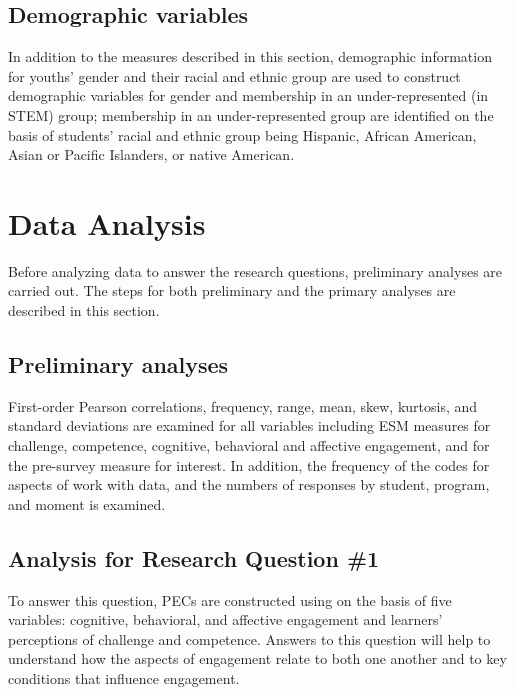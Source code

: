 \documentclass[]{msu-thesis}
\theoremstyle{definition}
\theoremstyle{definition}
\theoremstyle{definition}
\theoremstyle{remark}
\begin{document}
\subsection{Demographic variables}\label{demographic-variables}

In addition to the measures described in this section, demographic
information for youths' gender and their racial and ethnic group are
used to construct demographic variables for gender and membership in an
under-represented (in STEM) group; membership in an under-represented
group are identified on the basis of students' racial and ethnic group
being Hispanic, African American, Asian or Pacific Islanders, or native
American.

\section{Data Analysis}\label{data-analysis}

Before analyzing data to answer the research questions, preliminary
analyses are carried out. The steps for both preliminary and the primary
analyses are described in this section.

\subsection{Preliminary analyses}\label{preliminary-analyses}

First-order Pearson correlations, frequency, range, mean, skew,
kurtosis, and standard deviations are examined for all variables
including ESM measures for challenge, competence, cognitive, behavioral
and affective engagement, and for the pre-survey measure for interest.
In addition, the frequency of the codes for aspects of work with data,
and the numbers of responses by student, program, and moment is
examined.

\subsection{Analysis for Research Question
\#1}\label{analysis-for-research-question-1}

To answer this question, PECs are constructed using on the basis of five
variables: cognitive, behavioral, and affective engagement and learners'
perceptions of challenge and competence. Answers to this question will
help to understand how the aspects of engagement relate to both one
another and to key conditions that influence engagement.
\end{document}
